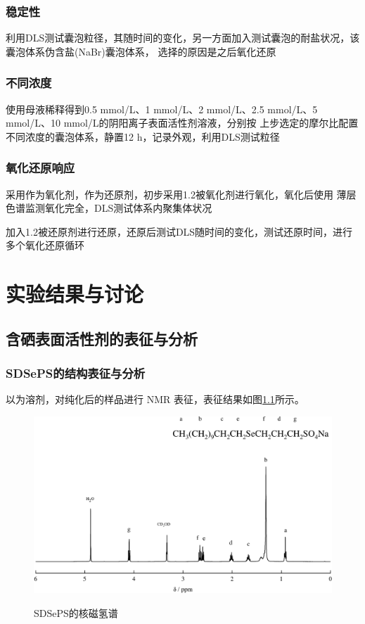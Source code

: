 \documentclass[bachelor,fandolfonts,replaceperiod]{jnuthesis}
\begin{document}
    \subsection{稳定性}
    利用DLS测试囊泡粒径，其随时间的变化，另一方面加入测试囊泡的耐盐状况，该囊泡体系伪含盐(NaBr)囊泡体系，
    选择的原因是之后氧化还原
    
    \subsection{不同浓度}
    使用母液稀释得到0.5 mmol/L、1 mmol/L、2 mmol/L、2.5 mmol/L、5 mmol/L、10 mmol/L的阴阳离子表面活性剂溶液，分别按
    上步选定的摩尔比配置不同浓度的囊泡体系，静置12 h，记录外观，利用DLS测试粒径
    
    \subsection{氧化还原响应}
    采用作为氧化剂，作为还原剂，初步采用1.2被氧化剂进行氧化，氧化后使用
    薄层色谱监测氧化完全，DLS测试体系内聚集体状况
    
    加入1.2被还原剂进行还原，还原后测试DLS随时间的变化，测试还原时间，进行多个氧化还原循环
    
    
    \chapter{实验结果与讨论}\label{chapter:results}
    \section{含硒表面活性剂的表征与分析}
    \subsection{SDSePS的结构表征与分析}
    以为溶剂，对纯化后的样品进行 NMR 表征，表征结果如图\ref{fig:SDSePS-nmr}所示。
    \begin{figure}[htbp]
        \centering
        \includegraphics[width=.75\textwidth]{figure/SDSePS-nmr.pdf}\\
        \caption{SDSePS的核磁氢谱}\label{fig:SDSePS-nmr}
    \end{figure}
     
\end{document}
